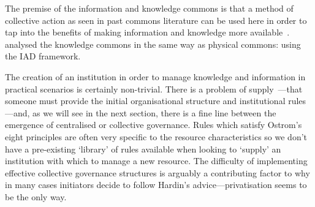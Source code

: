
The premise of the information and knowledge commons is that a method of collective action as seen in past commons literature can be used here in order to tap into the benefits of making information and knowledge more available~\citep{Hess2007,MayoFusterMorell2010,Shadbolt2013}. \citet{Ostrom2007a} analysed the knowledge commons in the same way as physical commons: using the \ac{IAD} framework.

The creation of an institution in order to manage knowledge and information in practical scenarios is certainly non-trivial. 
There is a problem of supply~\cite[p. 42]{Ostrom1990}---that someone must provide the initial organisational structure and institutional rules---and, as we will see in the next section, there is a fine line between the emergence of centralised or collective governance. 
Rules which satisfy Ostrom's eight principles are often very specific to the resource characteristics so we don't have a pre-existing `library' of rules available when looking to `supply' an institution with which to manage a new resource. 
The difficulty of implementing effective collective governance structures is arguably a contributing factor to why in many cases initiators decide to follow Hardin's advice---privatisation seems to be the only way.



